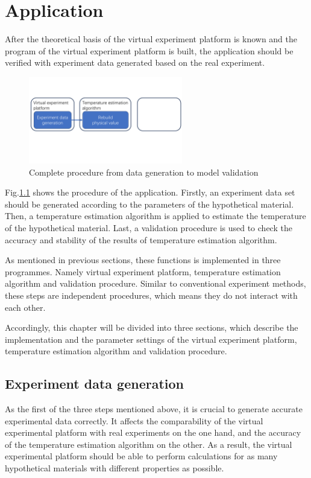 \chapter{Application}

After the theoretical basis of the virtual experiment platform is known and 
the program of the virtual experiment platform is built, the application should be 
verified with experiment data generated based on the real experiment.


\begin{figure}[htbp]
    \centering
    \includegraphics[width=0.6\textwidth]{figures/application_procedure_1.pdf}
    \caption{Complete procedure from data generation to model validation}
    \label{fig: application_procedure}
\end{figure}


Fig.\ref{fig: application_procedure} shows the procedure of the application.
Firstly, an experiment data set should be generated according to the parameters of the 
hypothetical material. Then, a temperature estimation algorithm is applied to 
estimate the temperature of the hypothetical material. Last, a validation procedure 
is used to check the accuracy and stability of the results of 
temperature estimation algorithm.


As mentioned in previous sections, these functions is implemented in three 
programmes. Namely virtual experiment platform, temperature estimation algorithm
and validation procedure. Similar to conventional experiment methods, these
steps are independent procedures, which means they do not interact with 
each other. 


Accordingly, this chapter will be divided into three sections, which describe 
the implementation and the parameter settings of the virtual experiment platform, 
temperature estimation algorithm and validation procedure.


\section{Experiment data generation}
As the first of the three steps mentioned above, it is crucial to generate 
accurate experimental data correctly. It affects the comparability of the 
virtual experimental platform with real experiments on the one hand, and 
the accuracy of the temperature estimation algorithm on the other. As a 
result, the virtual experimental platform should be able to perform 
calculations for as many hypothetical materials with different properties 
as possible.


